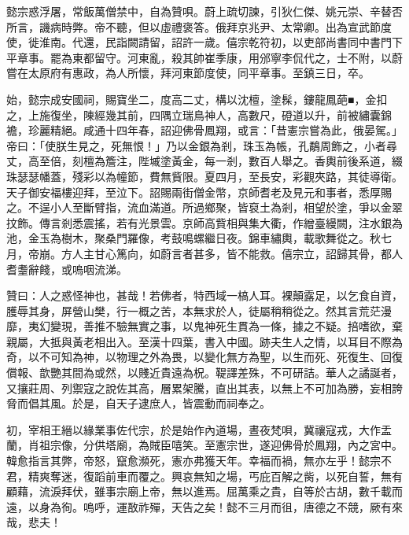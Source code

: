 \begin{pinyinscope}
 懿宗惑浮屠，常飯萬僧禁中，自為贊唄。蔚上疏切諫，引狄仁傑、姚元崇、辛替否所言，譏病時弊。帝不聽，但以虛禮褒答。俄拜京兆尹、太常卿。出為宣武節度使，徙淮南。代還，民詣闕請留，詔許一歲。僖宗乾符初，以吏部尚書同中書門下平章事。罷為東都留守。河東亂，殺其帥崔季康，用邠寧李侃代之，士不附，以蔚嘗在太原府有惠政，為人所懷，拜河東節度使，同平章事。至鎮三日，卒。



 始，懿宗成安國祠，賜寶坐二，度高二丈，構以沈檀，塗髹，鏤龍鳳葩■，金扣之，上施復坐，陳經幾其前，四隅立瑞鳥神人，高數尺，磴道以升，前被繡囊錦襜，珍麗精絕。咸通十四年春，詔迎佛骨鳳翔，或言：「昔憲宗嘗為此，俄晏駕。」帝曰：「使朕生見之，死無恨！」乃以金銀為剎，珠玉為帳，孔鷸周飾之，小者尋丈，高至倍，刻檀為簷注，陛墄塗黃金，每一剎，數百人舉之。香輿前後系道，綴珠瑟瑟幡蓋，殘彩以為幢節，費無貲限。夏四月，至長安，彩觀夾路，其徒導衛。天子御安福樓迎拜，至泣下。詔賜兩街僧金幣，京師耆老及見元和事者，悉厚賜之。不逞小人至斷臂指，流血滿道。所過鄉聚，皆裒土為剎，相望於塗，爭以金翠抆飾。傳言剎悉震搖，若有光景雲。京師高貲相與集大衢，作繒臺縵闕，注水銀為池，金玉為樹木，聚桑門羅像，考鼓鳴螺繼日夜。錦車繡輿，載歌舞從之。秋七月，帝崩。方人主甘心篤向，如蔚言者甚多，皆不能救。僖宗立，詔歸其骨，都人耆耋辭餞，或嗚咽流涕。



 贊曰：人之惑怪神也，甚哉！若佛者，特西域一槁人耳。裸顛露足，以乞食自資，臒辱其身，屏營山樊，行一概之苦，本無求於人，徒屬稍稍從之。然其言荒茫漫靡，夷幻變現，善推不驗無實之事，以鬼神死生貫為一條，據之不疑。掊嗜欲，棄親屬，大抵與黃老相出入。至漢十四葉，書入中國。跡夫生人之情，以耳目不際為奇，以不可知為神，以物理之外為畏，以變化無方為聖，以生而死、死復生、回復償報、歆艷其間為或然，以賤近貴遠為柷。鞮譯差殊，不可研詰。華人之譎誕者，又攘莊周、列禦寇之說佐其高，層累架騰，直出其表，以無上不可加為勝，妄相誇脅而倡其風。於是，自天子逮庶人，皆震動而祠奉之。



 初，宰相王縉以緣業事佐代宗，於是始作內道場，晝夜梵唄，冀禳寇戎，大作盂蘭，肖祖宗像，分供塔廟，為賊臣嘻笑。至憲宗世，遂迎佛骨於鳳翔，內之宮中。韓愈指言其弊，帝怒，竄愈瀕死，憲亦弗獲天年。幸福而禍，無亦左乎！懿宗不君，精爽奪迷，復蹈前車而覆之。興哀無知之場，丐庇百解之胔，以死自誓，無有顧藉，流淚拜伏，雖事宗廟上帝，無以進焉。屈萬乘之貴，自等於古胡，數千載而遠，以身為徇。嗚呼，運敔祚殫，天告之矣！懿不三月而徂，唐德之不競，厥有來哉，悲夫！



\end{pinyinscope}